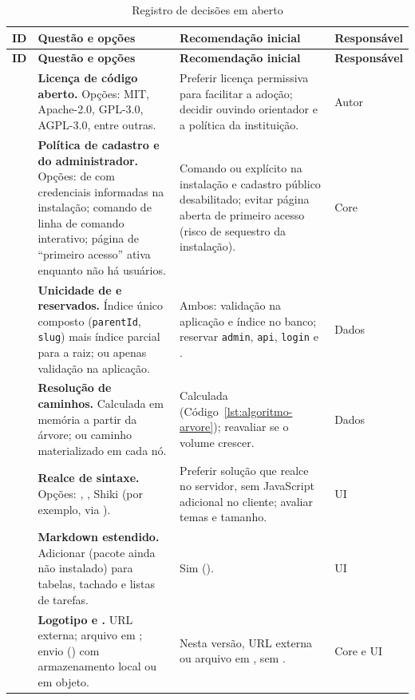 \begin{longtable}{@{}L{1.1cm}L{6.3cm}L{4.5cm}L{1.9cm}@{}}
\caption{Registro de decisões em aberto}\label{tab:decisoes}\\
\toprule
\textbf{ID} & \textbf{Questão e opções} & \textbf{Recomendação inicial} & \textbf{Responsável}\\
\midrule
\endfirsthead
\toprule
\textbf{ID} & \textbf{Questão e opções} & \textbf{Recomendação inicial} & \textbf{Responsável}\\
\midrule
\endhead
\bottomrule
\endfoot
{} & \textbf{Licença de código aberto.} Opções: MIT, Apache-2.0, GPL-3.0, AGPL-3.0, entre outras. & Preferir licença permissiva para facilitar a adoção; decidir ouvindo orientador e a política da instituição. & Autor\\[1pt]
 & \textbf{Política de cadastro e  do administrador.} Opções:  de  com credenciais informadas na instalação; comando de linha de comando interativo; página de ``primeiro acesso'' ativa enquanto não há usuários. & Comando ou  explícito na instalação e cadastro público desabilitado; evitar página aberta de primeiro acesso (risco de sequestro da instalação). & Core\\[1pt]
 & \textbf{Unicidade de  e  reservados.} Índice único composto (\texttt{parentId}, \texttt{slug}) mais índice parcial para a raiz; ou apenas validação na aplicação. & Ambos: validação na aplicação e índice no banco; reservar \texttt{admin}, \texttt{api}, \texttt{login} e . & Dados\\[1pt]
 & \textbf{Resolução de caminhos.} Calculada em memória a partir da árvore; ou caminho materializado em cada nó. & Calculada (Código~\ref{lst:algoritmo-arvore}); reavaliar se o volume crescer. & Dados\\[1pt]
 & \textbf{Realce de sintaxe.} Opções: , , Shiki (por exemplo, via ). & Preferir solução que realce no servidor, sem JavaScript adicional no cliente; avaliar temas e tamanho. & UI\\[1pt]
 & \textbf{Markdown estendido.} Adicionar  (pacote ainda não instalado) para tabelas, tachado e listas de tarefas. & Sim (). & UI\\[1pt]
 & \textbf{Logotipo e .} URL externa; arquivo em ; envio () com armazenamento local ou em objeto. & Nesta versão, URL externa ou arquivo em , sem . & Core e UI\\[1pt]

\end{longtable}
